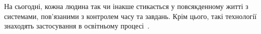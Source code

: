На сьогодні, кожна людина так чи інакше стикається у повсякденному житті з системами, пов'язаними з контролем часу та завдань. Крім цього, такі технології знаходять застосування в освітньому процесі~\cite{ліщина2014проблеми}.

